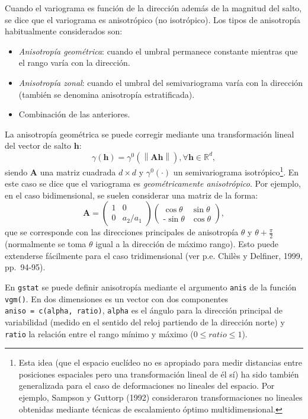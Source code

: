 \documentclass[
  spanish,
]{book}
\providecommand{\tightlist}{%
  \setlength{\itemsep}{0pt}\setlength{\parskip}{0pt}}
\theoremstyle{break}
\begin{document}
Cuando el variograma es función de la dirección además de la magnitud del salto, se dice que el variograma es anisotrópico (no isotrópico).
Los tipos de anisotropía habitualmente considerados son:

\begin{itemize}
\tightlist
\item
  \emph{Anisotropía geométrica}: cuando el umbral permanece constante mientras que el rango varía con la dirección.
\item
  \emph{Anisotropía zonal}: cuando el umbral del semivariograma varía con la dirección (también se denomina anisotropía estratificada).
\item
  Combinación de las anteriores.
\end{itemize}

La anisotropía geométrica se puede corregir mediante una transformación lineal del vector de salto \(\mathbf{h}\):
\[\gamma(\mathbf{h})=\gamma ^{0} \left( \left\| \mathbf{A}\mathbf{h}\right\| \right) ,\forall \mathbf{h}\in \mathbb{R}^{d},\]
siendo \(\mathbf{A}\) una matriz cuadrada \(d\times d\) y \(\gamma ^{0} (\cdot)\) un semivariograma isotrópico\footnote{Esta idea (que el espacio euclídeo no es apropiado para medir distancias entre posiciones espaciales pero una transformación lineal de él sí) ha sido también generalizada para el caso de deformaciones no lineales del espacio. Por ejemplo, Sampson y Guttorp (1992) consideraron transformaciones no lineales obtenidas mediante técnicas de escalamiento óptimo multidimensional.}.
En este caso se dice que el variograma es \emph{geométricamente anisotrópico}.
Por ejemplo, en el caso bidimensional, se suelen considerar una matriz de la forma:
\[\mathbf{A}=\left( 
\begin{array}{cc}
1  & 0 \\
0 & a_2/a_1 
\end{array}
\right) \left( 
\begin{array}{cc}
\cos \theta  & \sin\theta  \\
\text{-} \sin\theta  & \cos \theta 
\end{array}
\right),\]
que se corresponde con las direcciones principales de anisotropía \(\theta\) y \(\theta + \frac{\pi }{\text{2}}\) (normalmente se toma \(\theta\) igual a la dirección de máximo rango).
Esto puede extenderse fácilmente para el caso tridimensional (ver p.e. Chilès y Delfiner, 1999, pp.~94-95).

En \texttt{gstat} se puede definir anisotropía mediante el argumento \texttt{anis} de la función \texttt{vgm()}.
En dos dimensiones es un vector con dos componentes \texttt{aniso\ =\ c(alpha,\ ratio)}, \texttt{alpha} es el ángulo para la dirección principal de variabilidad (medido en el sentido del reloj partiendo de la dirección norte) y \texttt{ratio} la relación entre el rango mínimo y máximo (\(0 \leq ratio \leq 1\)).
\end{document}
